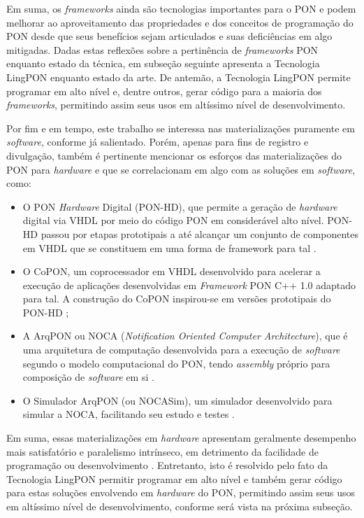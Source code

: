 Em suma, os \textit{frameworks} ainda são tecnologias importantes para o PON e
podem melhorar ao aproveitamento das propriedades e dos conceitos de programação
do PON desde que seus benefícios sejam articulados e suas deficiências em algo
mitigadas. Dadas estas reflexões sobre a pertinência de \textit{frameworks} PON
enquanto estado da técnica, em subseção seguinte apresenta a Tecnologia LingPON
enquanto estado da arte. De antemão, a Tecnologia LingPON permite programar em
alto nível e, dentre outros, gerar código para a maioria dos \textit{frameworks},
permitindo assim seus usos em altíssimo nível de desenvolvimento. 

Por fim e em tempo, este trabalho se interessa nas materializações puramente em
\textit{software}, conforme já salientado. Porém, apenas para fins de registro e
divulgação, também é pertinente mencionar os esforços das materializações do PON
para \textit{hardware} e que se correlacionam em algo com as soluções em \textit{software}, como: 

\begin{itemize}
  \item O PON \textit{Hardware} Digital (PON-HD), que permite a geração de
  \textit{hardware} digital via VHDL por meio do código PON em considerável alto
  nível. PON-HD passou por etapas prototipais a até alcançar um conjunto de
  componentes em VHDL que se constituem em uma forma de framework para tal
  \cite{doc_Kerschbaumer_2018,kerschbaumer_2018_2,kerschbaumer_2018_1}.
  \item O CoPON, um coprocessador em VHDL desenvolvido para acelerar a execução
  de aplicações desenvolvidas em \textit{Framework} PON C++ 1.0 adaptado para
  tal. A construção do CoPON inspirou-se em versões prototipais do PON-HD
  \cite{msc_Peters_2012,peters_2012}; 
  \item A ArqPON ou NOCA (\textit{Notification Oriented Computer Architecture}), que é
  uma arquitetura de computação desenvolvida para a execução de
  \textit{software} segundo o modelo computacional do PON, tendo \textit{assembly}
  próprio para composição de \textit{software} em si
  \cite{doc_linhares_2015,linhares_2020}.
  \item O Simulador ArqPON (ou NOCASim), um simulador desenvolvido para simular
  a NOCA, facilitando seu estudo e testes \cite{msc_pordeus_2017,linhares_2020}. 
\end{itemize}

Em suma, essas materializações em \textit{hardware} apresentam geralmente
desempenho mais satisfatório e paralelismo intrínseco, em detrimento da
facilidade de programação ou desenvolvimento \cite{doc_ronszcka_2019}.
Entretanto, isto é resolvido pelo fato da Tecnologia LingPON permitir programar
em alto nível e também gerar código para estas soluções envolvendo em
\textit{hardware} do PON, permitindo assim seus usos em altíssimo nível de
desenvolvimento, conforme será vista na próxima subseção.


